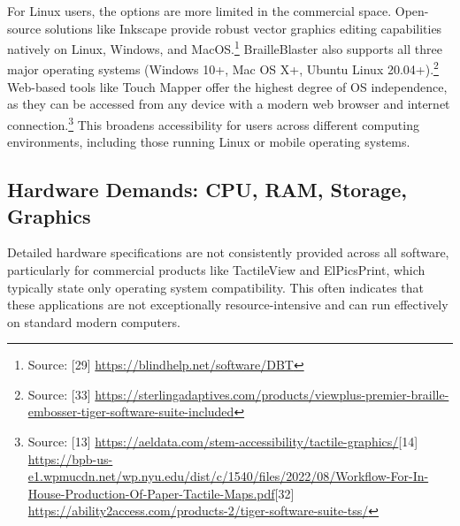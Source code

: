 For Linux users, the options are more limited in the commercial space. Open-source solutions like Inkscape provide robust vector graphics editing capabilities natively on Linux, Windows, and MacOS.\footnote{Source: [29] \url{https://blindhelp.net/software/DBT}} BrailleBlaster also supports all three major operating systems (Windows 10+, Mac OS X+, Ubuntu Linux 20.04+).\footnote{Source: [33] \url{https://sterlingadaptives.com/products/viewplus-premier-braille-embosser-tiger-software-suite-included}} Web-based tools like Touch Mapper offer the highest degree of OS independence, as they can be accessed from any device with a modern web browser and internet connection.\footnote{Source: [13] \url{https://aeldata.com/stem-accessibility/tactile-graphics/}[14] \url{https://bpb-us-e1.wpmucdn.net/wp.nyu.edu/dist/c/1540/files/2022/08/Workflow-For-In-House-Production-Of-Paper-Tactile-Maps.pdf}[32] \url{https://ability2access.com/products-2/tiger-software-suite-tss/}} This broadens accessibility for users across different computing environments, including those running Linux or mobile operating systems.

\subsection{Hardware Demands: CPU, RAM, Storage, Graphics}

Detailed hardware specifications are not consistently provided across all software, particularly for commercial products like TactileView and ElPicsPrint, which typically state only operating system compatibility. This often indicates that these applications are not exceptionally resource-intensive and can run effectively on standard modern computers.

